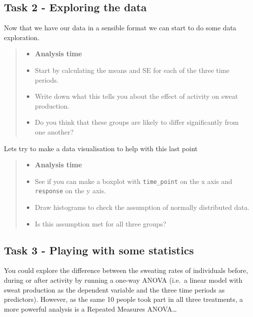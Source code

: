 \documentclass[
]{book}
\providecommand{\tightlist}{%
  \setlength{\itemsep}{0pt}\setlength{\parskip}{0pt}}
\begin{document}
\subsection{Task 2 - Exploring the data}\label{task-2---exploring-the-data-2}

Now that we have our data in a sensible format we can start to do some data exploration.

\begin{quote}
\begin{itemize}
\tightlist
\item
  \textbf{Analysis time}
\item
  Start by calculating the means and SE for each of the three time periods.
\item
  Write down what this tells you about the effect of activity on sweat production.
\item
  Do you think that these groups are likely to differ significantly from one another?
\end{itemize}
\end{quote}

Lets try to make a data visualisation to help with this last point

\begin{quote}
\begin{itemize}
\tightlist
\item
  \textbf{Analysis time}
\item
  See if you can make a boxplot with \texttt{time\_point} on the x axis and \texttt{response} on the y axis.
\item
  Draw histograms to check the assumption of normally distributed data.
\item
  Is this assumption met for all three groups?
\end{itemize}
\end{quote}

\subsection{Task 3 - Playing with some statistics}\label{task-3---playing-with-some-statistics}

You could explore the difference between the sweating rates of individuals before, during or after activity by running a one-way ANOVA (i.e.~a linear model with sweat production as the dependent variable and the three time periods as predictors). However, as the same 10 people took part in all three treatments, a more powerful analysis is a Repeated Measures ANOVA\ldots{}
\end{document}

